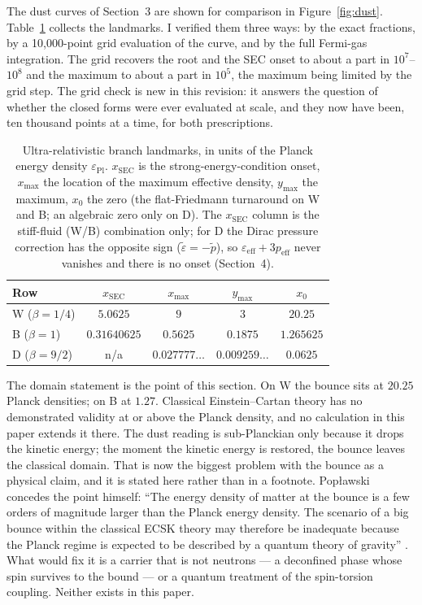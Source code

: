 \documentclass[11pt]{article}
\newcommand{\epsPl}{\varepsilon_{\mathrm{Pl}}}
\begin{document}
The dust curves of Section~3 are shown for comparison in
Figure~\ref{fig:dust}. Table~\ref{tab:ur} collects the landmarks. I verified them three ways:
by the exact fractions, by a 10,000-point grid evaluation of the curve,
and by the full Fermi-gas integration. The grid recovers the root and
the SEC onset to about a part in $10^7$--$10^8$ and the maximum to about
a part in $10^5$, the maximum being limited by the grid step. The grid
check is new in this revision: it answers the question of whether the
closed forms were ever evaluated at scale, and they now have been, ten
thousand points at a time, for both prescriptions.

\begin{table}[h]
\centering
\caption{Ultra-relativistic branch landmarks, in units of the Planck
energy density $\epsPl$. $x_{\mathrm{SEC}}$ is the strong-energy-condition
onset, $x_{\max}$ the location of the maximum effective density,
$y_{\max}$ the maximum, $x_0$ the zero (the flat-Friedmann turnaround on W
and B; an algebraic zero only on D). The $x_{\mathrm{SEC}}$ column is the
stiff-fluid (W/B) combination only; for D the Dirac pressure correction
has the opposite sign ($\tilde\varepsilon = -\tilde p$), so
$\varepsilon_{\mathrm{eff}} + 3p_{\mathrm{eff}}$ never vanishes and there
is no onset (Section~4).}\label{tab:ur}
\begin{tabular}{lcccc}
\toprule
Row & $x_{\mathrm{SEC}}$ & $x_{\max}$ & $y_{\max}$ & $x_0$ \\
\midrule
W ($\beta=1/4$) & $5.0625$ & $9$ & $3$ & $20.25$ \\
B ($\beta=1$) & $0.31640625$ & $0.5625$ & $0.1875$ & $1.265625$ \\
D ($\beta=9/2$) & n/a & $0.027777\ldots$ & $0.009259\ldots$ & $0.0625$ \\
\bottomrule
\end{tabular}
\end{table}

The domain statement is the point of this section. On W the bounce sits
at $20.25$ Planck densities; on B at $1.27$. Classical Einstein--Cartan
theory has no demonstrated validity at or above the Planck density, and
no calculation in this paper extends it there. The dust reading is
sub-Planckian only because it drops the kinetic energy; the moment the
kinetic energy is restored, the bounce leaves the classical domain. That
is now the biggest problem with the bounce as a physical claim, and it
is stated here rather than in a footnote. Pop{\l}awski concedes the
point himself: ``The energy density of matter at the bounce is a few
orders of magnitude larger than the Planck energy density. The scenario
of a big bounce within the classical ECSK theory may therefore be
inadequate because the Planck regime is expected to be described by a
quantum theory of gravity'' \cite{Poplawski12b}. What would fix it is a
carrier that is not neutrons --- a deconfined phase whose spin survives
to the bound --- or a quantum treatment of the spin-torsion coupling.
Neither exists in this paper.
\end{document}
